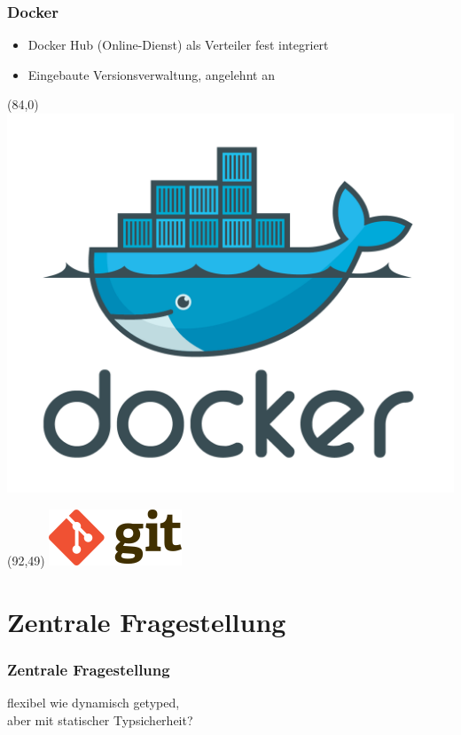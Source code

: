 \documentclass{beamer}
\begin{document}
\begin{frame}
\frametitle{Docker}

\begin{itemize}
\setlength{\itemsep}{20pt}
\item Docker Hub (Online-Dienst) als Verteiler fest integriert
\item Eingebaute Versionsverwaltung, angelehnt an
\end{itemize}

\begin{textblock}{20}(84,0)
\includegraphics[scale=0.22]{docker.png}
\end{textblock}

\begin{textblock}{20}(92,49)
\includegraphics[scale=0.22]{gitlogo.png}
\end{textblock}

\end{frame}

\section{Zentrale Fragestellung}
\begin{frame}
\frametitle{Zentrale Fragestellung}

\centering
\glqq flexibel wie dynamisch getyped,\\ aber mit statischer Typsicherheit?\grqq{}

\end{frame}
\end{document}
